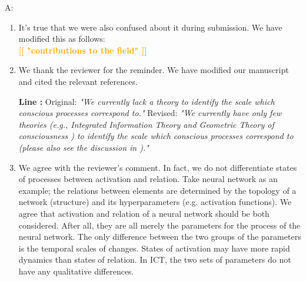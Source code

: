 \documentclass[utf8]{article}
\newenvironment{ans}  
    {\color{Black}\noindent A:}
    {~\newline}
\newcommand{\revise}[3]{
	\newline
	\newline
    \noindent
    \textbf{Line #1:}
    \newline
    Original:\newline
    \textit{"#2"}
    \newline
    \newline
    Revised:\newline
    \textit{"#3"}\newline}
\newcommand{\toWrite}[1]{\noindent
	\textcolor{Orange}{\textbf{[[ #1 ]]}}}
\begin{document}
    	\begin{ans}
    		\begin{enumerate}
    			\item It's true that we were also confused about it during submission. 
    			We have modified this as follows: \\
    			\toWrite{"contributions to the field"}
    			
    			\item We thank the reviewer for the reminder. We have modified our manuscript and cited the relevant references. 
    			\revise{}
    			{We currently lack a theory to identify the scale which conscious processes correspond to.}
    			{We currently have only few theories (e.g., Integrated Information Theory \citep{hoel2016can} and Geometric Theory of consciousness \citep{fekete2011towards,fekete2012lack}) to identify the scale which conscious processes correspond to (please also see the discussion in \cite{fekete2016system}).}    			
    			
    			\item We agree with the reviewer's comment. 
                In fact, we do not differentiate states of processes between activation and relation. Take neural network as an example; the relations between elements are determined by the topology of a network (structure) and  its hyperparameters (e.g. activation functions). We agree that activation and relation of a neural network should be both considered. After all, they are all merely the parameters for the process of the neural network. The only difference between the two groups of the parameters is the temporal scales of changes. States of activation may have more rapid dynamics than states of relation. In ICT, the two sets of parameters do not have any qualitative differences. 
    			
    			
    			
    		\end{enumerate}
    		
    	\end{ans}
        
        
\end{document}
